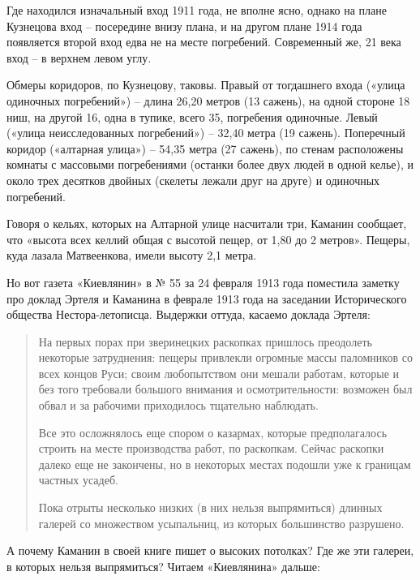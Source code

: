 Где находился изначальный вход 1911 года, не вполне ясно, однако на плане Кузнецова вход – посередине внизу плана, и на другом плане 1914 года появляется второй вход едва не на месте погребений. Современный же, 21 века вход – в верхнем левом углу.


Обмеры коридоров, по Кузнецову, таковы. Правый от тогдашнего входа («улица одиночных погребений») – длина 26,20 метров (13 сажень), на одной стороне 18 ниш, на другой 16, одна в тупике, всего 35, погребения одиночные. Левый («улица неисследованных погребений») – 32,40 метра (19 сажень). Поперечный коридор («алтарная улица») – 54,35 метра (27 сажень), по стенам расположены комнаты с массовыми погребениями (останки более двух людей в одной келье), и около трех десятков двойных (скелеты лежали друг на друге) и одиночных погребений.

Говоря о кельях, которых на Алтарной улице насчитали три, Каманин сообщает, что «высота всех келлий общая с высотой пещер, от 1,80 до 2 метров». Пещеры, куда лазала Матвеенкова, имели высоту 2,1 метра.

Но вот газета «Киевлянин» в № 55 за 24 февраля 1913 года поместила заметку про доклад Эртеля и Каманина в феврале 1913 года на заседании Исторического общества Нестора-летописца. Выдержки оттуда, касаемо доклада Эртеля:

\begin{quotation}
На первых порах при зверинецких раскопках пришлось преодолеть некоторые затруднения: пещеры привлекли огромные массы паломников со всех концов Руси; своим любопытством они мешали работам, которые и без того требовали большого внимания и осмотрительности: возможен был обвал и за рабочими приходилось тщательно наблюдать.

Все это осложнялось еще спором о казармах, которые предполагалось строить на месте производства работ, по раскопкам. Сейчас раскопки далеко еще не закончены, но в некоторых местах подошли уже к границам частных усадеб.

Пока отрыты несколько низких (в них нельзя выпрямиться) длинных галерей со множеством усыпальниц, из которых большинство разрушено.
\end{quotation}

А почему Каманин в своей книге пишет о высоких потолках? Где же эти галереи, в которых нельзя выпрямиться? Читаем «Киевлянина» дальше:

